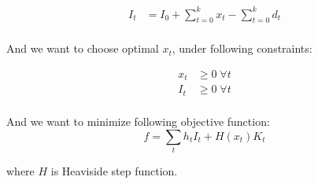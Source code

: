 \begin{align*}
  I_t &= I_0 + \sum_{t=0}^k{x_t} - \sum_{t=0}^k{d_t}\\
\end{align*}

And we want to choose optimal $x_t$, under following constraints:

\begin{align*}
  x_t &\ge 0 \; \forall t\\
  I_t &\ge 0 \; \forall t\\
\end{align*}

And we want to minimize following objective function:
\begin{equation*}
  f = \sum_t{h_t I_t + H(x_t)K_t}
\end{equation*}

where $H$ is Heaviside step function.
